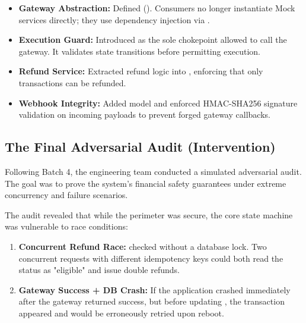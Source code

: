 \begin{tcolorbox}[batchbox={Key Implementations in Batch 4}]
\begin{itemize}
    \item \textbf{Gateway Abstraction:} Defined  (). Consumers no longer instantiate Mock services directly; they use dependency injection via .
    \item \textbf{Execution Guard:} Introduced  as the sole chokepoint allowed to call the gateway. It validates state transitions before permitting execution.
    \item \textbf{Refund Service:} Extracted refund logic into , enforcing that only  transactions can be refunded.
    \item \textbf{Webhook Integrity:} Added  model and enforced HMAC-SHA256 signature validation on incoming payloads to prevent forged gateway callbacks.
\end{itemize}
\end{tcolorbox}

\vspace{0.5cm}

\subsection{The Final Adversarial Audit (Intervention)}

Following Batch 4, the engineering team conducted a simulated adversarial audit. The goal was to prove the system's financial safety guarantees under extreme concurrency and failure scenarios.

\begin{tcolorbox}[dangerbox={Critical Vulnerabilities Discovered (P0)}]
The audit revealed that while the perimeter was secure, the core state machine was vulnerable to race conditions:
\begin{enumerate}
    \item \textbf{Concurrent Refund Race:}  checked  without a database lock. Two concurrent requests with different idempotency keys could both read the status as "eligible" and issue double refunds.
    \item \textbf{Gateway Success + DB Crash:} If the application crashed immediately after the gateway returned success, but before updating , the transaction appeared  and would be erroneously retried upon reboot.
\end{enumerate}
\end{tcolorbox}

